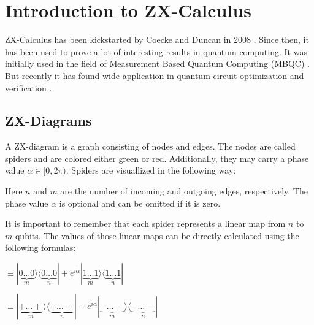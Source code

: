 \section{Introduction to ZX-Calculus}

ZX-Calculus has been kickstarted by Coecke and Duncan in 2008 \cite{Coecke2007graphicalcalculus}. Since then, it has been used to prove a lot of interesting results in quantum computing. It was initially used in the field of Measurement Based Quantum Computing (MBQC) \cite{duncan2012graphical}. But recently it has found wide application in quantum circuit optimization and verification  \cite{vandewetering2020zxcalculus}.

\subsection{ZX-Diagrams}

A ZX-diagram is a graph consisting of nodes and edges. The nodes are called spiders and are colored either green or red. Additionally, they may carry a phase value $\alpha \in [0, 2\pi)$. Spiders are visuallized in the following way:


\vspace{5pt}
\begin{ZX}
      \zxZ{\alpha} 
\end{ZX}

\vspace{5pt}


\begin{ZX}
      \zxX{\alpha} 
\end{ZX}
\vspace{5pt}


Here $n$ and $m$ are the number of incoming and outgoing edges, respectively. The phase value $\alpha$ is optional and can be omitted if it is zero.

It is important to remember that each spider represents a linear map from $n$ to $m$ qubits. The values of those linear maps can be directly calculated using the following formulas:

\vspace{5pt}
 $\equiv |\underbrace{0\dots 0}_{m}\rangle \langle \underbrace{0\dots0}_{n}| + e^{i\alpha}|\underbrace{1\dots1}_{m}\rangle \langle \underbrace{1\dots1}_{n}|$

\vspace{5pt}
\begin{ZX}
      \zxZ{\alpha} 
\end{ZX} $\equiv |\underbrace{+\dots +}_{m}\rangle \langle \underbrace{+\dots+}_{n}| - e^{i\alpha}|\underbrace{-\dots-}_{m}\rangle \langle \underbrace{-\dots-}_{n}|$
\vspace{5pt}



